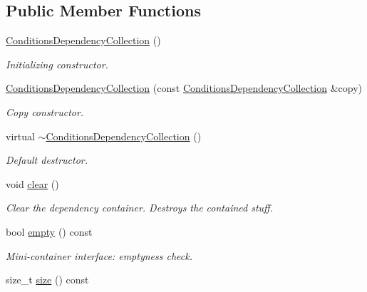 \subsection*{Public Member Functions}
\begin{DoxyCompactItemize}
\item 
\hyperlink{class_d_d4hep_1_1_conditions_1_1_conditions_dependency_collection_af714a3d709ece6040aea1e4d65645015}{Conditions\+Dependency\+Collection} ()
\begin{DoxyCompactList}\small\item\em Initializing constructor. \end{DoxyCompactList}\item 
\hyperlink{class_d_d4hep_1_1_conditions_1_1_conditions_dependency_collection_a244d8717b93fb02a5899b00556a16da4}{Conditions\+Dependency\+Collection} (const \hyperlink{class_d_d4hep_1_1_conditions_1_1_conditions_dependency_collection}{Conditions\+Dependency\+Collection} \&copy)
\begin{DoxyCompactList}\small\item\em Copy constructor. \end{DoxyCompactList}\item 
virtual \hyperlink{class_d_d4hep_1_1_conditions_1_1_conditions_dependency_collection_ad09c3071e28a0cae78a9bc8945331619}{$\sim$\+Conditions\+Dependency\+Collection} ()
\begin{DoxyCompactList}\small\item\em Default destructor. \end{DoxyCompactList}\item 
void \hyperlink{class_d_d4hep_1_1_conditions_1_1_conditions_dependency_collection_ace3a46d90c1770071d31ae203dadf518}{clear} ()
\begin{DoxyCompactList}\small\item\em Clear the dependency container. Destroys the contained stuff. \end{DoxyCompactList}\item 
bool \hyperlink{class_d_d4hep_1_1_conditions_1_1_conditions_dependency_collection_aa201768f743d5d58188ca5412ea6e10f}{empty} () const
\begin{DoxyCompactList}\small\item\em Mini-\/container interface\+: emptyness check. \end{DoxyCompactList}\item 
size\+\_\+t \hyperlink{class_d_d4hep_1_1_conditions_1_1_conditions_dependency_collection_a5a5f4e4508993890f83e60f8fe44d93c}{size} () const

\end{DoxyCompactItemize}
